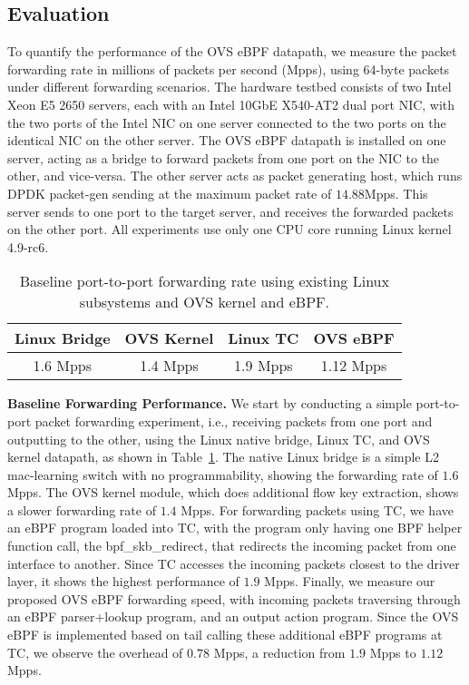 \documentclass[10pt,numbers,reprint]{sigplanconf}
\begin{document}
\subsection{Evaluation}\label{evaluation}
To quantify the performance of the OVS eBPF datapath, we measure the packet
forwarding rate in millions of packets per second (Mpps), using 64-byte
packets under different forwarding scenarios. The hardware testbed
consists of two Intel Xeon E5 2650 servers, each with an Intel 10GbE
X540-AT2 dual port NIC, with the two ports of the Intel NIC on one server
connected to the two ports on the identical NIC on the other server. The
OVS eBPF datapath is installed on one server, acting as a bridge to
forward packets from one port on the NIC to the other, and vice-versa.
The other server acts as packet generating host, which runs DPDK
packet-gen sending at the maximum packet rate of
$14.88$Mpps. This server sends to one port to the target server, and
receives the forwarded packets on the other port. All experiments use
only one CPU core running Linux kernel 4.9-rc6.
\begin{table}
\centering
\small
\begin{tabular}{|c | c | c| c|}
\hline
 {\bf Linux Bridge} & {\bf OVS Kernel } & {\bf Linux TC} & {\bf OVS eBPF}\\ \hline
 1.6 Mpps & 1.4 Mpps & 1.9 Mpps & 1.12 Mpps\\ \hline
\end{tabular}
\caption{\footnotesize
Baseline port-to-port forwarding rate using existing Linux subsystems and
OVS kernel and eBPF.
}
\label{table:baseperf}
\end{table}

\textbf{Baseline Forwarding Performance.}
We start by conducting a simple port-to-port packet forwarding experiment,
i.e., receiving packets from one port and outputting to the other,
using the Linux native bridge, Linux TC, and OVS kernel datapath, as shown in
Table~\ref{table:baseperf}.
The native Linux bridge is a simple L2 mac-learning switch with no
programmability, showing the forwarding rate of $1.6$ Mpps.
The OVS kernel module, which does additional flow key extraction,
shows a slower forwarding rate of $1.4$ Mpps.
For forwarding packets using TC, we have an eBPF program loaded
into TC, with the program only having one BPF helper function call, the
bpf\_skb\_redirect, that redirects the incoming packet from one interface
to another.  Since TC accesses the incoming packets closest to the driver
layer, it shows the highest performance of $1.9$ Mpps.
Finally, we measure our proposed OVS eBPF forwarding speed,
with incoming packets traversing through an eBPF parser+lookup program,
and an output action program.
Since the OVS eBPF is implemented based on tail calling these
additional eBPF programs at TC, we observe the overhead of $0.78$ Mpps,
a reduction from $1.9$ Mpps to $1.12$ Mpps.
\end{document}

